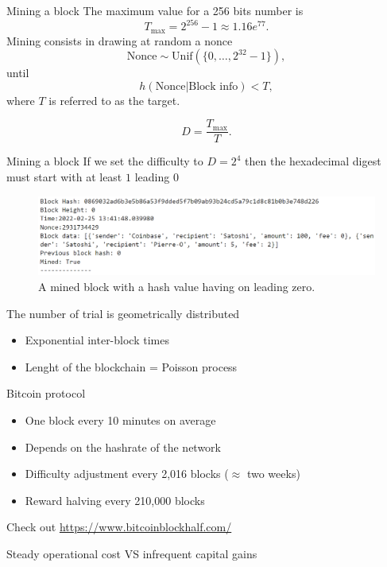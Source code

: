\documentclass{beamer}
\begin{document}
\begin{frame}{Mining a block}
The maximum value for a 256 bits number is
$$
T_\text{max} = 2^{256}-1 \approx 1.16e^{77}.
$$
Mining consists in drawing at random a nonce 
$$
\text{Nonce} \sim \text{Unif}(\{0,\ldots, 2^{32}-1\}),
$$
until 
$$
h(\text{Nonce}|\text{Block info})<T,
$$
where $T$ is referred to as the target.
\begin{tcolorbox}[enhanced,drop shadow, title=Difficulty of the cryptopuzzle]
$$
D = \frac{T_{\max}}{T}.
$$
\end{tcolorbox}

\end{frame}
\begin{frame}{Mining a block}
If we set the difficulty to $D = 2^4$ then the hexadecimal digest must start with at least $1$ leading $0$
\begin{figure}[!ht]
    \includegraphics[width = \textwidth]{../../Figures/block_mined.png}
    \captionsetup{width=0.8\textwidth}
    \centering
    \caption{A mined block with a hash value having on leading zero.}
    \label{fig:block_mined}
\end{figure}
The number of trial is geometrically distributed
\begin{itemize}
\item Exponential inter-block times
\item Lenght of the blockchain = Poisson process
\end{itemize}
\end{frame}
\begin{frame}{Bitcoin protocol}
\begin{itemize}
  \item One block every 10 minutes on average
  \item Depends on the hashrate of the network
  \item Difficulty adjustment every 2,016 blocks ($\approx$ two weeks)
  \item Reward halving every 210,000 blocks
\end{itemize}
Check out \url{https://www.bitcoinblockhalf.com/}
\begin{tcolorbox}[enhanced,drop shadow, title=Risky business]
Steady operational cost VS infrequent capital gains
\end{tcolorbox}
\end{frame}
\end{document}
